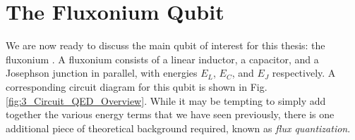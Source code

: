 
\clearpage
\section{The Fluxonium Qubit}

We are now ready to discuss the main qubit of interest for this thesis: the fluxonium \cite{manucharyan2009fluxonium}. A fluxonium consists of a linear inductor, a capacitor, and a Josephson junction in parallel, with energies $E_L$, $E_C$, and $E_J$ respectively. A corresponding circuit diagram for this qubit is shown in Fig. \eqref{fig:3_Circuit_QED_Overview}. While it may be tempting to simply add together the various energy terms that we have seen previously, there is one additional piece of theoretical background required, known as \textit{flux quantization}. 

